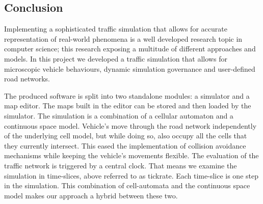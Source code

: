 \subsection*{Conclusion}
Implementing a sophisticated traffic simulation that allows for accurate representation of real-world phenomena is a well developed research topic in computer science; this research exposing a multitude of different approaches and models. In this project we developed a traffic simulation that allows for microscopic vehicle behaviours, dynamic simulation governance and user-defined road networks. 

The produced software is split into two standalone modules: a simulator and a map editor. The maps built in the editor can be stored and then loaded by the simulator. The simulation is a combination of a cellular automaton and a continuous space model. Vehicle's move through the road network independently of the underlying cell model, but while doing so, also occupy all the cells that they currently intersect. This eased the implementation of collision avoidance mechanisms while keeping the vehicle's movements flexible. The evaluation of the traffic network is triggered by a central clock. That means we examine the simulation in time-slices, above referred to as tickrate. Each time-slice is one step in the simulation. This combination of cell-automata and the continuous space model makes our approach a hybrid between these two.

